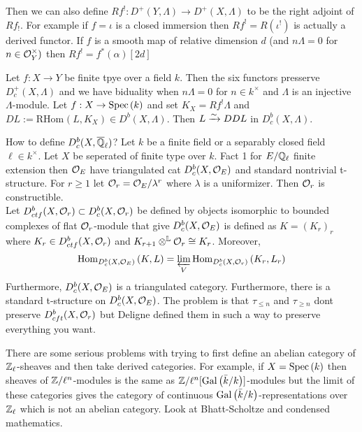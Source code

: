 \documentclass[12pt]{article}
\begin{document}
Then we can also define $R f^! : D^+(Y, \Lambda) \to D^+(X, \Lambda)$ to be the right adjoint of $R f_!$. For example if $f = \iota$ is a closed immersion then $R f^! = R(\iota^!)$ is actually a derived functor. If $f$ is a smooth map of relative dimension $d$ (and $n \Lambda = 0$ for $n \in \mathcal{O}_{Y}^\times)$ then $R f^! = f^*(\alpha) [2d]$ 

\newcommand{\RHom}[3]{\mathrm{RHom}_{#1}\left( #2, #3 \right)}
\newcommand{\dtimes}{\otimes^{\mathbb{L}}}

\begin{theorem}
Let $f : X \to Y$ be finite tpye over a field $k$. Then the six functors presserve $D_c^+(X, \Lambda)$ and we have biduality when $n \Lambda = 0$ for $n \in k^\times$ and $\Lambda$ is an injective $\Lambda$-module. Let $f : X \to \mathrm{Spec}\left( k \right)$ and set $K_X = R f^! \Lambda$ and $DL := \RHom{}{L}{K_X} \in D^b(X, \Lambda)$. Then $L \xrightarrow{\sim} DDL$ in $D_c^b(X, \Lambda)$.
\end{theorem}
\noindent
How to define $D_c^b(X, \overline{\mathbb{Q}}_\ell)$? Let $k$ be a finite field or a separably closed field $\ell \in k^\times$. Let $X$ be seperated of finite type over $k$. Fact 1 for $E / \mathbb{Q}_\ell$ finite extension then $\mathcal{O}_{E}$ have triangulated cat $D^b_c(X, \mathcal{O}_{E})$ and standard nontrivial t-structure. For $r \ge 1$ let $\mathcal{O}_{r} = \mathcal{O}_{E} / \lambda^r$ where $\lambda$ is a uniformizer. Then $\mathcal{O}_{r}$ is constructible.
\bigskip\\
Let $D^b_{ctf}(X, \mathcal{O}_{r}) \subset D^b_c(X, \mathcal{O}_{r})$ be defined by objects isomorphic to bounded complexes of flat $\mathcal{O}_{r}$-module that give $D_c^b(X, \mathcal{O}_{E})$ is defined as $K = (K_r)_r$ where $K_r \in D^b_{ctf}(X, \mathcal{O}_{r})$ and $K_{r+1} \dtimes \struct{r} \cong K_r$. Moreover,
\[ \mathrm{Hom}_{D^b_c(X, \mathcal{O}_{E})} \left( K, L \right) = \varprojlim_V \mathrm{Hom}_{D^b_c(X, \mathcal{O}_{r})} \left( K_r, L_r \right) \]
Furthermore, $D^b_c(X, \mathcal{O}_{E})$ is a triangulated category. Furthermore, there is a standard t-structure on $D^b_c(X, \mathcal{O}_{E})$. The problem is that $\tau_{\le n}$ and $\tau_{\ge n}$ dont preserve $D^b_{cft}(X, \mathcal{O}_{r})$ but Deligne defined them in such a way to preserve everything you want.

\begin{rmk}
There are some serious problems with trying to first define an abelian category of $\mathbb{Z}_\ell$-sheaves and then take derived categories. For example, if $X = \mathrm{Spec}\left( k \right)$ then sheaves of $\mathbb{Z} / \ell^n$-modules is the same as $\mathbb{Z}/\ell^n[\mathrm{Gal}\left( \bar{k}/k \right)]$-modules but the limit of these categories gives the category of continuous $\mathrm{Gal}\left( \bar{k}/k \right)$-representations over $\mathbb{Z}_\ell$ which is not an abelian category. Look at Bhatt-Scholtze and condensed mathematics.
\end{rmk}
\end{document}

